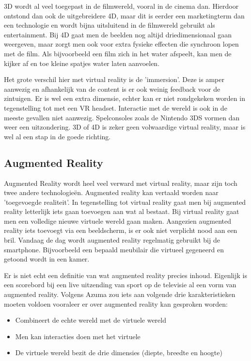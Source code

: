 3D wordt al veel toegepast in de filmwereld, vooral in de cinema dan. Hierdoor ontstond dan ook de uitgebreidere 4D, maar dit is eerder een marketingterm dan een technologie en wordt bijna uitsluitend in de filmwereld gebruikt als entertainment. Bij 4D gaat men de beelden nog altijd driedimensionaal gaan weergeven, maar zorgt men ook voor extra fysieke effecten die synchroon lopen met de film. Als bijvoorbeeld een film zich in het water afspeelt, kan men de kijker af en toe kleine spatjes water laten aanvoelen.

Het grote verschil hier met virtual reality is de 'immersion'. Deze is amper aanwezig en afhankelijk van de content is er ook weinig feedback voor de zintuigen. Er is wel een extra dimensie, echter kan er niet rondgekeken worden in tegenstelling tot met een VR headset. Interactie met de wereld is ook in de meeste gevallen niet aanwezig. Spelconsoles zoals de Nintendo 3DS vormen dan weer een uitzondering. 3D of 4D is zeker geen volwaardige virtual reality, maar is wel al een stap in de goede richting. \autocite{Peniche2016}

\subsection{Augmented Reality}
\label{subsec:augmented-reality}
Augmented Reality wordt heel veel verward met virtual reality, maar zijn toch twee andere technologieën. Augmented reality kan vertaald worden naar 'toegevoegde realiteit'. In tegenstelling tot virtual reality gaat men bij augmented reality letterlijk iets gaan toevoegen aan wat al bestaat. Bij virtual reality gaat men een volledige nieuwe virtuele wereld gaan maken. Aangezien augmented reality iets toevoegt via een beeldscherm, is er ook niet verplicht nood aan een bril. Vandaag de dag wordt augmented reality regelmatig gebruikt bij de smartphone. Bijvoorbeeld een bepaald meubilair die virtueel gegeneerd en getoond wordt in een kamer.

Er is niet echt een definitie van wat augmented reality precies inhoud. Eigenlijk is een scorebord bij een live uitzending van sport op de televisie al een vorm van augmented reality. Volgens Azuma \autocite{Azuma1997} zou iets aan volgende drie karakteristieken moeten voldoen vooraleer er over augmented reality kan gesproken worden:

\begin{itemize}
	\item Combineert de echte wereld met de virtuele wereld
	\item Men kan interacties doen met het virtuele
	\item De virtuele wereld bezit de drie dimensies (diepte, breedte en hoogte)
\end{itemize}

